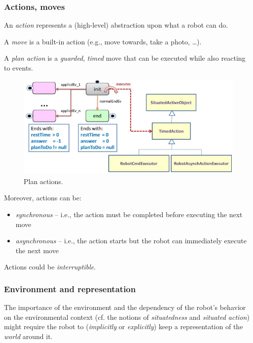 \documentclass[11pt]{article}
\begin{document}
\subsubsection{Actions, moves}

An \emph{action} represents a (high-level) abstraction upon what a robot can do.

A \emph{move} is a built-in action (e.g., move towards, take a photo, \ldots).

A \emph{plan action} is a \emph{guarded}, \emph{timed} move that can be executed
while also reacting to events.

\begin{figure}[H]
    \centering
     \includegraphics[scale=0.60, trim=4cm 0 0
     -1cm]{img/concept_planAction.png}
    \caption{Plan actions.}
    \label{fig:planActs}
\end{figure} 


Moreover, actions can be:

\begin{itemize}
  \item \emph{synchronous} -- i.e., the action must be completed before
  executing the next move
  \item \emph{asynchronous} -- i.e., the action starts but the robot can
  immediately execute the next move
\end{itemize}

Actions could be \emph{interruptible}.

 
\subsubsection{Environment and representation}

The importance of the environment and the dependency of the robot's behavior on
 the environmental context (cf. the notions of \emph{situatedness} and 
 \emph{situated action}) might require the robot to (\emph{implicitly} or \emph{explicitly}) keep
 a representation of the \emph{world} around it. 
 
\end{document}
